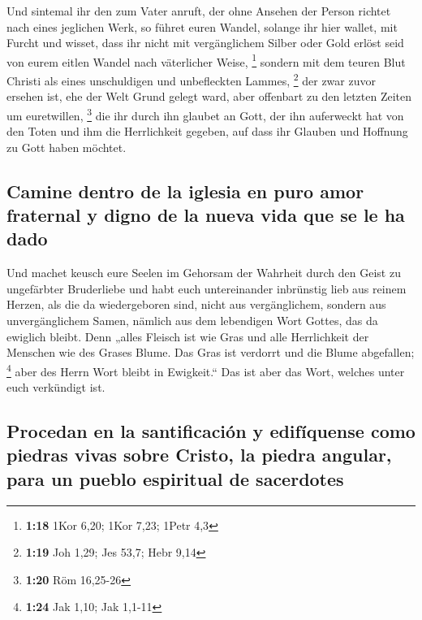  Und sintemal ihr den zum Vater anruft, der ohne Ansehen
der Person richtet nach eines jeglichen Werk, so führet euren Wandel,
solange ihr hier wallet, mit Furcht  und wisset, dass ihr
nicht mit vergänglichem Silber oder Gold erlöst seid von eurem eitlen
Wandel nach väterlicher Weise, \footnote{\textbf{1:18} 1Kor 6,20; 1Kor
  7,23; 1Petr 4,3}  sondern mit dem teuren Blut Christi
als eines unschuldigen und unbefleckten Lammes, \footnote{\textbf{1:19}
  Joh 1,29; Jes 53,7; Hebr 9,14}  der zwar zuvor ersehen
ist, ehe der Welt Grund gelegt ward, aber offenbart zu den letzten
Zeiten um euretwillen, \footnote{\textbf{1:20} Röm 16,25-26}
 die ihr durch ihn glaubet an Gott, der ihn auferweckt
hat von den Toten und ihm die Herrlichkeit gegeben, auf dass ihr Glauben
und Hoffnung zu Gott haben möchtet.

\hypertarget{camine-dentro-de-la-iglesia-en-puro-amor-fraternal-y-digno-de-la-nueva-vida-que-se-le-ha-dado}{%
\subsection{Camine dentro de la iglesia en puro amor fraternal y digno
de la nueva vida que se le ha
dado}\label{camine-dentro-de-la-iglesia-en-puro-amor-fraternal-y-digno-de-la-nueva-vida-que-se-le-ha-dado}}

 Und machet keusch eure Seelen im Gehorsam der Wahrheit
durch den Geist zu ungefärbter Bruderliebe und habt euch untereinander
inbrünstig lieb aus reinem Herzen,  als die da
wiedergeboren sind, nicht aus vergänglichem, sondern aus unvergänglichem
Samen, nämlich aus dem lebendigen Wort Gottes, das da ewiglich bleibt.
 Denn „alles Fleisch ist wie Gras und alle Herrlichkeit
der Menschen wie des Grases Blume. Das Gras ist verdorrt und die Blume
abgefallen; \footnote{\textbf{1:24} Jak 1,10; Jak 1,1-11}
 aber des Herrn Wort bleibt in Ewigkeit.`` Das ist aber
das Wort, welches unter euch verkündigt ist.

\hypertarget{procedan-en-la-santificaciuxf3n-y-edifuxedquense-como-piedras-vivas-sobre-cristo-la-piedra-angular-para-un-pueblo-espiritual-de-sacerdotes}{%
\subsection{Procedan en la santificación y edifíquense como piedras
vivas sobre Cristo, la piedra angular, para un pueblo espiritual de
sacerdotes}\label{procedan-en-la-santificaciuxf3n-y-edifuxedquense-como-piedras-vivas-sobre-cristo-la-piedra-angular-para-un-pueblo-espiritual-de-sacerdotes}}

